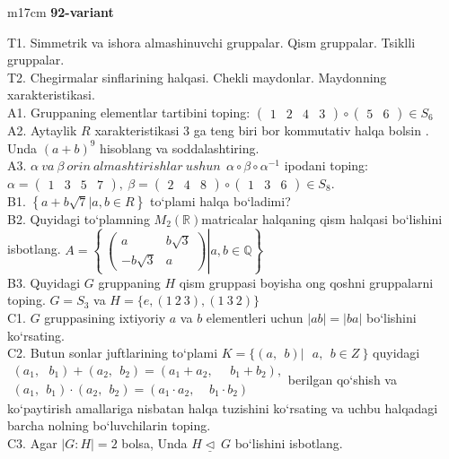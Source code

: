 \documentclass{article}
\begin{document}
\begin{tabular}{m{17cm}}
\textbf{92-variant}
\newline

T1. Simmetrik va ishora almashinuvchi gruppalar. Qism gruppalar. Tsiklli gruppalar. \\
T2. Chegirmalar sinflarining halqasi. Chekli maydonlar. Maydonning xarakteristikasi. \\
A1. Gruppaning elementlar tartibini toping: \(\begin{pmatrix}
1 & 2 & 4 & 3
\end{pmatrix} \circ \begin{pmatrix}
5 & 6
\end{pmatrix} \in S_{6}\) \\
A2. Aytaylik \(R\) xarakteristikasi 3 ga teng biri bor kommutativ halqa bo\textquotesingle lsin . Unda \((a + b)^{9}\) hisoblang va soddalashtiring. \\
A3. \(\alpha\ va\ \beta\ orin\ almashtirishlar\ ushun\ \ \alpha \circ \beta \circ \alpha^{- 1}\) ipodani toping:\(\alpha = \begin{pmatrix}
1 & 3 & 5 & 7
\end{pmatrix},\ \beta = \begin{pmatrix}
2 & 4 & 8
\end{pmatrix} \circ \begin{pmatrix}
1 & 3 & 6
\end{pmatrix} \in S_{8}\). \\
B1. \(\left\{ a + b\sqrt{7}|a,b \in R \right\}\) to`plami halqa bo`ladimi? \\
B2. Quyidagi to`plamning \(M_{2}(\mathbb{R})\)matricalar halqaning qism halqasi bo`lishini isbotlang. \(A = \left\{ \left. \ \begin{pmatrix}
a & b\sqrt{3} \\
 - b\sqrt{3} & a
\end{pmatrix} \right|a,b\mathbb{\in Q} \right\}\) \\
B3. Quyidagi \(G\) gruppaning \(H\) qism gruppasi boyisha o\textquotesingle ng qo\textquotesingle shni gruppalarni toping. \(G = S_{3}\) va \(H = \{ e,(1\ 2\ 3),(1\ 3\ 2)\}\) \\
C1. \(G\) gruppasining ixtiyoriy \(a\) va \(b\) elementleri uchun \(|ab| = |ba|\) bo`lishini ko`rsating. \\
C2. Butun sonlar juftlarining to`plami \(K = \{(a,\ \ b)\left| \ \ \ a,\ \ b \in Z \right.\ \}\) quyidagi \(\begin{matrix}
(a_{1},\ \ \ b_{1}) + (a_{2},\ \ b_{2}) = (a_{1} + a_{2},\ \ \ \ \ \ b_{1} + b_{2}), \\
(a_{1},\ \ b_{1}) \cdot (a_{2},\ \ b_{2}) = (a_{1} \cdot a_{2},\ \ \ \ \ b_{1} \cdot b_{2})
\end{matrix}\)berilgan qo`shish va ko`paytirish amallariga nisbatan halqa tuzishini ko`rsating va uchbu halqadagi barcha nolning bo`luvchilarin toping. \\
C3. Agar \(|G:H| = 2\) bolsa, Unda \(H\underline{\vartriangleleft}\ G\) bo`lishini isbotlang. \\

\end{tabular}
\vspace{1cm}
\end{document}
